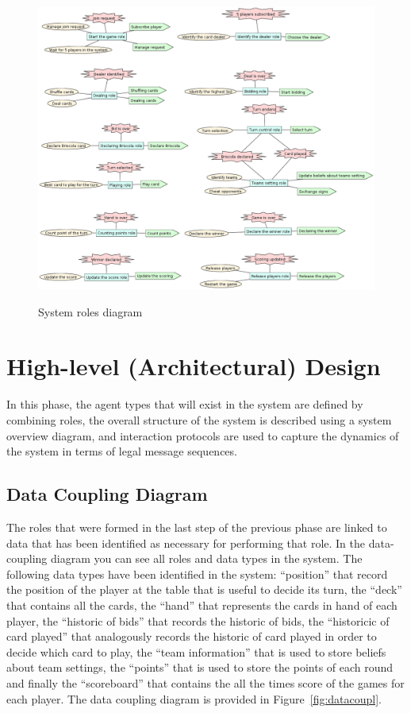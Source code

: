 \documentclass[a4paper]{article}
\begin{document}
\begin{figure}[htp]
  \includegraphics[keepaspectratio,scale=0.4]{pdt/images/system_specification/system_roles.png}
  \label{fig:sysroles}
  \caption{System roles diagram}
\end{figure}

\section{High-level (Architectural) Design}\label{sec:highdesign}

In this phase, the agent types that will exist in the system are defined by combining roles, the overall structure of the system is described using a system overview diagram, and interaction protocols are used to capture the dynamics of the system in terms of legal message sequences.

\subsection{Data Coupling Diagram}

The roles that were formed in the last step of the previous phase are linked to data that has been identified as necessary for performing that role. In the data-coupling diagram you can see all roles and data types in the system. The following data types have been identified in the system: ``position'' that record the position of the player at the table that is useful to decide its turn, the ``deck'' that contains all the cards, the ``hand'' that represents the cards in hand of each player, the ``historic of bids'' that records the historic of bids, the ``historicic of card played'' that analogously records the historic of card played in order to decide which card to play, the ``team information'' that is used to store beliefs about team settings, the ``points'' that is used to store the points of each round and finally the ``scoreboard'' that contains the all the times score of the games for each player. The data coupling diagram is provided in Figure~\ref{fig:datacoupl}.
\end{document}
